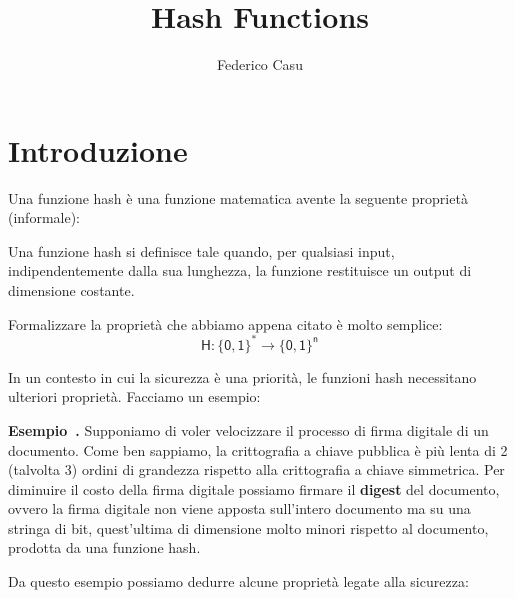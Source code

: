 \documentclass{article}
\title{Hash Functions}
\author{Federico Casu}
\newcounter{example}[section]
\newenvironment{example}[1][]{\refstepcounter{example}\par\medskip
   \noindent \textbf{Esempio~\theexample. #1} \rmfamily}{\medskip}
\begin{document}
\maketitle


\section{Introduzione}
Una funzione hash è una funzione matematica avente la seguente proprietà (informale):

\begin{boxH}
    Una funzione hash si definisce tale quando, per qualsiasi input, indipendentemente dalla sua lunghezza, la funzione restituisce un output di dimensione costante.
\end{boxH}

\par \noindent Formalizzare la proprietà che abbiamo appena citato è molto semplice:
\begin{equation*}
    \mathsf{H : \{0,1\}^* \rightarrow \{0,1\}^n}
\end{equation*}

\par In un contesto in cui la sicurezza è una priorità, le funzioni hash necessitano ulteriori proprietà. Facciamo un esempio:

\begin{example}
    Supponiamo di voler velocizzare il processo di firma digitale di un documento. Come ben sappiamo, la crittografia a chiave pubblica è 
    più lenta di 2 (talvolta 3) ordini di grandezza rispetto alla crittografia a chiave simmetrica. Per diminuire il costo della firma digitale 
    possiamo firmare il \textbf{digest} del documento, ovvero la firma digitale non viene apposta sull'intero documento ma su una stringa di bit, 
    quest'ultima di dimensione molto minori rispetto al documento, prodotta da una funzione hash.
\end{example}

\par \noindent Da questo esempio possiamo dedurre alcune proprietà legate alla sicurezza:
\end{document}
